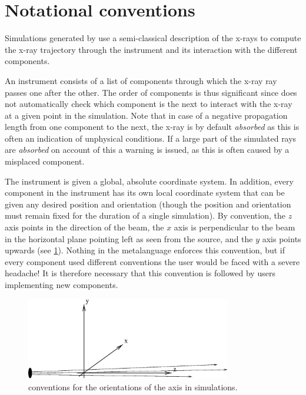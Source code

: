 \section{Notational conventions}

Simulations generated by \MCX use a semi-classical description of the
x-rays to compute the x-ray trajectory through the instrument and its
interaction with the different components. 

An instrument consists of a list of components through which the x-ray
ray passes one after the other. The order of components is thus significant
since \MCX does not automatically check which component is the next to
interact with the x-ray at a given point in the simulation. Note
that in case of a negative propagation length from one component to the
next, the x-ray is by default \emph{absorbed} as this is often
an indication of unphysical conditions. If a large part of the simulated rays are \emph{absorbed}
on account of this a warning is issued, as this is often caused by a misplaced component.

The instrument is given a global, absolute coordinate system. In
addition, every component in the instrument has its own local coordinate
system that can be given any desired position and orientation (though
the position and orientation must remain fixed for the duration of a
single simulation). 
By convention, the $z$ axis points in the direction of the beam, the $x$ axis
is perpendicular to the beam in the horizontal plane pointing left as seen
from the source, and the $y$ axis points upwards (see \cref{f:axis}).
Nothing in the \MCX metalanguage enforces this convention, but if every component used
different conventions the user would be faced with a severe headache! It is
therefore necessary that this convention is followed by users implementing
new components.
\begin{figure}
  \begin{center}
    \includegraphics[width=0.8\textwidth]{figures/axis-conventions.eps}
  \end{center}
\caption{conventions for the orientations of the axis in simulations.}
\label{f:axis}
\end{figure}

